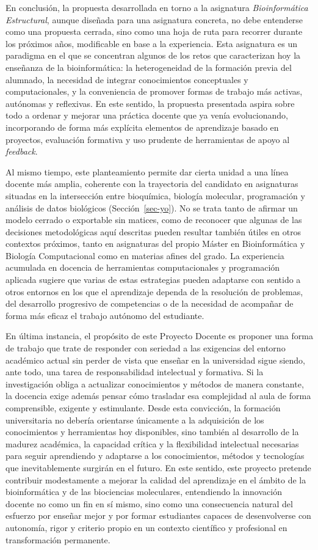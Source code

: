 \documentclass[
  11pt,
  a4paper,
  twoside]{scrreprt}
\begin{document}
En conclusión, la propuesta desarrollada en torno a la asignatura
\emph{Bioinformática Estructural}, aunque diseñada para una asignatura
concreta, no debe entenderse como una propuesta cerrada, sino como una
hoja de ruta para recorrer durante los próximos años, modificable en
base a la experiencia. Esta asignatura es un paradigma en el que se
concentran algunos de los retos que caracterizan hoy la enseñanza de la
bioinformática: la heterogeneidad de la formación previa del alumnado,
la necesidad de integrar conocimientos conceptuales y computacionales, y
la conveniencia de promover formas de trabajo más activas, autónomas y
reflexivas. En este sentido, la propuesta presentada aspira sobre todo a
ordenar y mejorar una práctica docente que ya venía evolucionando,
incorporando de forma más explícita elementos de aprendizaje basado en
proyectos, evaluación formativa y uso prudente de herramientas de apoyo
al \emph{feedback}.

Al mismo tiempo, este planteamiento permite dar cierta unidad a una
línea docente más amplia, coherente con la trayectoria del candidato en
asignaturas situadas en la intersección entre bioquímica, biología
molecular, programación y análisis de datos biológicos
(Sección~\ref{sec-yo}). No se trata tanto de afirmar un modelo cerrado o
exportable sin matices, como de reconocer que algunas de las decisiones
metodológicas aquí descritas pueden resultar también útiles en otros
contextos próximos, tanto en asignaturas del propio Máster en
Bioinformática y Biología Computacional como en materias afines del
grado. La experiencia acumulada en docencia de herramientas
computacionales y programación aplicada sugiere que varias de estas
estrategias pueden adaptarse con sentido a otros entornos en los que el
aprendizaje dependa de la resolución de problemas, del desarrollo
progresivo de competencias o de la necesidad de acompañar de forma más
eficaz el trabajo autónomo del estudiante.

En última instancia, el propósito de este Proyecto Docente es proponer
una forma de trabajo que trate de responder con seriedad a las
exigencias del entorno académico actual sin perder de vista que enseñar
en la universidad sigue siendo, ante todo, una tarea de responsabilidad
intelectual y formativa. Si la investigación obliga a actualizar
conocimientos y métodos de manera constante, la docencia exige además
pensar cómo trasladar esa complejidad al aula de forma comprensible,
exigente y estimulante. Desde esta convicción, la formación
universitaria no debería orientarse únicamente a la adquisición de los
conocimientos y herramientas hoy disponibles, sino también al desarrollo
de la madurez académica, la capacidad crítica y la flexibilidad
intelectual necesarias para seguir aprendiendo y adaptarse a los
conocimientos, métodos y tecnologías que inevitablemente surgirán en el
futuro. En este sentido, este proyecto pretende contribuir modestamente
a mejorar la calidad del aprendizaje en el ámbito de la bioinformática y
de las biociencias moleculares, entendiendo la innovación docente no
como un fin en sí mismo, sino como una consecuencia natural del esfuerzo
por enseñar mejor y por formar estudiantes capaces de desenvolverse con
autonomía, rigor y criterio propio en un contexto científico y
profesional en transformación permanente.
\end{document}
